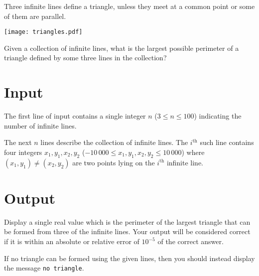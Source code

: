 
Three infinite lines define a triangle, unless they meet at a common point or some of them are parallel.

\begin{center}
\texttt{[image: triangles.pdf]}
\end{center}

Given a collection of infinite lines, what is the largest possible perimeter of a triangle defined by some three
lines in the collection?

\section*{Input}
The first line of input contains a single integer $n$ ($3 \leq n \leq 100$) indicating the number of infinite lines.

The next $n$ lines describe the collection of infinite lines. The $i^{\textrm{th}}$ such line contains four integers 
$x_1, y_1, x_2, y_2$ ($-10\,000 \leq x_1, y_1, x_2, y_2 \leq 10\,000$) where $(x_1, y_1) \neq (x_2, y_2)$
are two points lying on the $i^{\textrm{th}}$ infinite line.

\section*{Output}
Display a single real value which is the perimeter of the largest triangle that can
be formed from three of the infinite lines. Your output will be considered
correct if it is within an absolute or relative error of $10^{-5}$ of the
correct answer.

If no triangle can be formed using the given lines, then you should instead
display the message \texttt{no triangle}.
